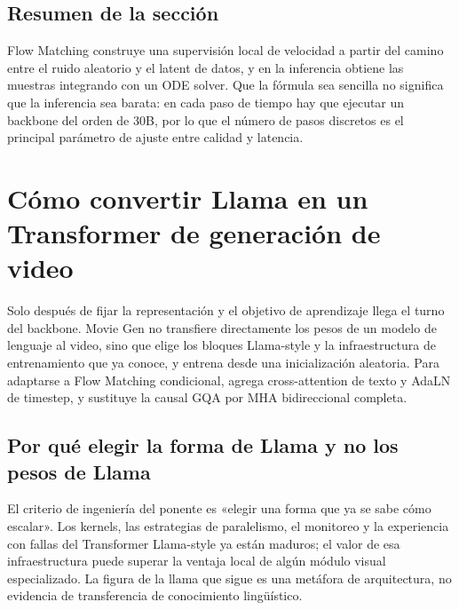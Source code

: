 \documentclass[a4paper]{article}
\begin{document}

\subsection{Resumen de la sección}

Flow Matching construye una supervisión local de velocidad a partir del camino entre el ruido aleatorio y el latent de datos, y en la inferencia obtiene las muestras integrando con un ODE solver. Que la fórmula sea sencilla no significa que la inferencia sea barata: en cada paso de tiempo hay que ejecutar un backbone del orden de 30B, por lo que el número de pasos discretos es el principal parámetro de ajuste entre calidad y latencia.
\section{Cómo convertir Llama en un Transformer de generación de video}

Solo después de fijar la representación y el objetivo de aprendizaje llega el turno del backbone. Movie Gen no transfiere directamente los pesos de un modelo de lenguaje al video, sino que elige los bloques Llama-style y la infraestructura de entrenamiento que ya conoce, y entrena desde una inicialización aleatoria. Para adaptarse a Flow Matching condicional, agrega cross-attention de texto y AdaLN de timestep, y sustituye la causal GQA por MHA bidireccional completa.

\subsection{Por qué elegir la forma de Llama y no los pesos de Llama}

El criterio de ingeniería del ponente es «elegir una forma que ya se sabe cómo escalar». Los kernels, las estrategias de paralelismo, el monitoreo y la experiencia con fallas del Transformer Llama-style ya están maduros; el valor de esa infraestructura puede superar la ventaja local de algún módulo visual especializado. La figura de la llama que sigue es una metáfora de arquitectura, no evidencia de transferencia de conocimiento lingüístico.
\end{document}
